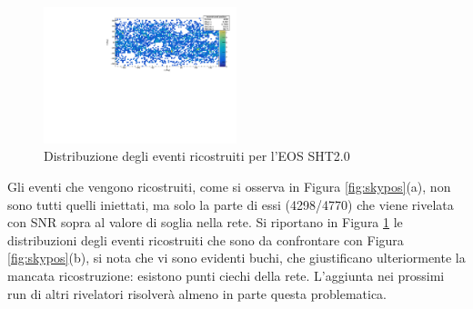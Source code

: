\begin{figure}
	\vspace{-15pt}
	\begin{center}
		\includegraphics[width=0.5\textwidth]{figures/Capitolo_3/report/RopositionSHT2_0spin1.pdf}
	\end{center}
	\vspace{-10pt}
	\caption{Distribuzione degli eventi ricostruiti per l'EOS SHT2.0}
	\label{fig:skyposrec}
	\vspace{-15pt}
\end{figure}
Gli eventi che vengono ricostruiti, come si osserva in Figura \ref{fig:skypos}(a), non sono tutti quelli iniettati, ma solo la parte di essi (4298/4770) che viene rivelata con SNR sopra al valore di soglia nella rete. Si riportano in Figura \ref{fig:skyposrec} le distribuzioni degli eventi ricostruiti che sono da confrontare con Figura \ref{fig:skypos}(b), si nota che vi sono evidenti buchi, che giustificano ulteriormente la mancata ricostruzione: esistono punti ciechi della rete. L'aggiunta nei prossimi run di altri rivelatori risolverà almeno in parte questa problematica. 

